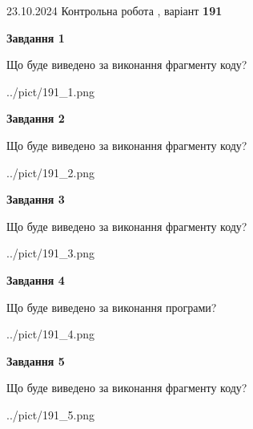 \documentclass[12pt, ukrainian]{article}
\begin{document}
{\Large{23.10.2024 Контрольна робота , варіант  \No \textbf { 191 }\par}}
{
\begin {large}
{\begin {center}\textbf{Завдання 1}\end {center}}

Що буде виведено за виконання фрагменту коду?\par
\begin{center}
	{../pict/191_1.png}
\end{center}
\newpage

{\begin {center}\textbf{Завдання 2}\end {center}}

Що буде виведено за виконання фрагменту коду?\par
\begin{center}
	{../pict/191_2.png}
\end{center}
\newpage

{\begin {center}\textbf{Завдання 3}\end {center}}

Що буде виведено за виконання фрагменту коду?\par
\begin{center}
	{../pict/191_3.png}
\end{center}
\newpage

{\begin {center}\textbf{Завдання 4}\end {center}}

Що буде виведено за виконання програми?\par
\begin{center}
	{../pict/191_4.png}
\end{center}
\newpage

{\begin {center}\textbf{Завдання 5}\end {center}}

Що буде виведено за виконання фрагменту коду?\par
\begin{center}
	{../pict/191_5.png}
\end{center}
\newpage


\end{large}}
\end{document}
